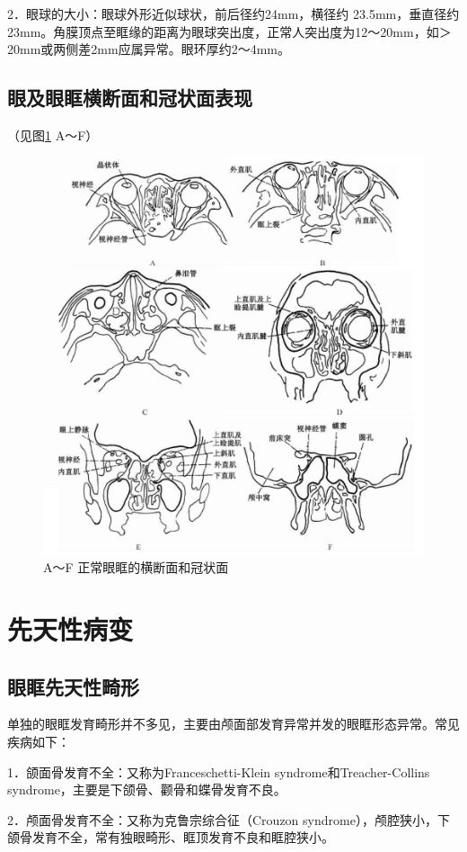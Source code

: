 2．眼球的大小：眼球外形近似球状，前后径约24mm，横径约
23.5mm，垂直径约23mm。角膜顶点至眶缘的距离为眼球突出度，正常人突出度为12～20mm，如＞20mm或两侧差2mm应属异常。眼环厚约2～4mm。

\subsection{眼及眼眶横断面和冠状面表现}

（见图\ref{fig3-1} A～F）

\begin{figure}[!htbp]
 \centering
 \includegraphics[width=.7\textwidth,height=\textheight,keepaspectratio]{./images/Image00096.jpg}
 \captionsetup{justification=centering}
 \caption{A～F 正常眼眶的横断面和冠状面}
 \label{fig3-1}
  \end{figure} 

\section{先天性病变}

\subsection{眼眶先天性畸形}

单独的眼眶发育畸形并不多见，主要由颅面部发育异常并发的眼眶形态异常。常见疾病如下：

1．颌面骨发育不全：又称为Franceschetti-Klein syndrome和Treacher-Collins
syndrome，主要是下颌骨、颧骨和蝶骨发育不良。

2．颅面骨发育不全：又称为克鲁宗综合征（Crouzon
syndrome），颅腔狭小，下颌骨发育不全，常有独眼畸形、眶顶发育不良和眶腔狭小。

